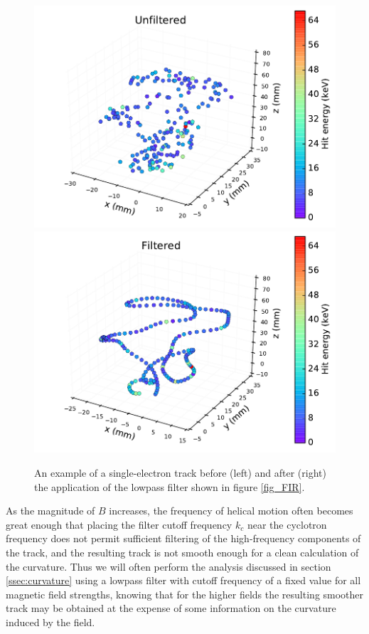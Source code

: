 \documentclass{JINST}
\begin{document}
\begin{figure}[!htb]
	\centering
	\includegraphics[scale=0.48]{fig/plt_trk_unflt_nmagse2_6.pdf}
	\includegraphics[scale=0.48]{fig/plt_trk_flt_nmagse2_6.pdf}
	\caption{\label{fig_flt}An example of a single-electron track before (left) and after (right) the application of the lowpass filter shown in figure \protect\ref{fig_FIR}.}
\end{figure}

As the magnitude of $B$ increases, the frequency of helical motion often becomes great enough that placing the filter
cutoff frequency $k_{c}$ near the cyclotron frequency does not permit sufficient filtering of the high-frequency
components of the track, and the resulting track is not smooth enough for a clean calculation of the curvature.
Thus we will often perform the analysis discussed in section \ref{ssec:curvature} using a lowpass filter with 
cutoff frequency of a fixed value for all magnetic field strengths, knowing that for the higher fields the resulting 
smoother track may be obtained at the expense of some information on the curvature induced by the field.
\end{document}
